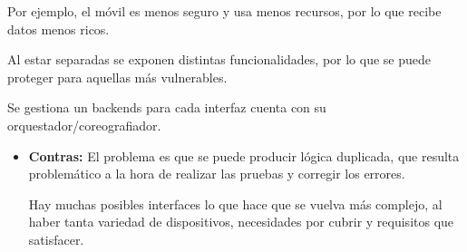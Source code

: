 \documentclass[12pt, twoside, openright]{report} %
\begin{document}
Por ejemplo, el móvil es menos seguro y usa menos recursos, por lo que recibe datos menos ricos.

Al estar separadas se exponen distintas funcionalidades, por lo que se puede proteger para aquellas más vulnerables.

Se gestiona un backends para cada interfaz cuenta con su orquestador/coreografiador.

\begin{itemize}
	\item \textbf{Contras:} El problema es que se puede producir lógica duplicada, que resulta problemático a la hora de realizar las pruebas y corregir los errores.

	      Hay muchas posibles interfaces lo que hace que se vuelva más complejo, al haber tanta variedad de dispositivos, necesidades por cubrir y requisitos que satisfacer.
\end{itemize}
\pagebreak
\end{document}
